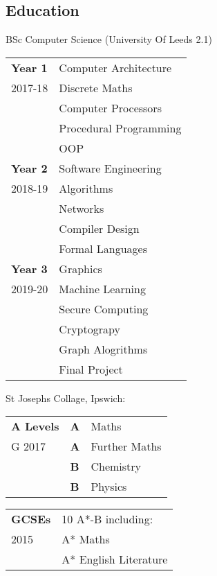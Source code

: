 \documentclass[9pt,a4paper]{article}
\begin{document}
\begin{multicols*}{3}
  \section*{Education}
  \vspace*{-.3cm}
  BSc Computer Science 
  \newline (University Of Leeds 2.1)
  \vspace*{-6mm}
\begin{center}
  \begin{tabular}{p{1.2cm}p{5.4cm}}
    \textbf{Year 1}&Computer Architecture\\
	2017-18&Discrete Maths\\
			&Computer Processors\\
	    &Procedural Programming\\
      &OOP\vspace{.3cm}\\
    \textbf{Year 2}&Software Engineering\\
    2018-19&Algorithms\\
    &Networks\\
    &Compiler Design\\
    &Formal Languages\vspace{.3cm}\\
    \textbf{Year 3}&Graphics\\
    2019-20&Machine Learning\\
    &Secure Computing\\
    &Cryptograpy\\
    &Graph Alogrithms\\
    &Final Project
  \end{tabular}
\end{center}
  St Josephs Collage, Ipswich:
  \vspace*{-.6cm}
\begin{center}
  \begin{tabular}{p{1.5cm} p{0.3cm} p{5.4cm}}
    \textbf{A Levels}&\textbf{A}&Maths\\
G	2017&\textbf{A}&Further Maths\\
	    &\textbf{B}&Chemistry\\
	    &\textbf{B}&Physics\\
  \end{tabular}
  \begin{tabular}{p{1.5cm} p{5.7cm}}
    \textbf{GCSEs}
        & 10 A*-B including:\\
        2015&A* Maths\\
        &A* English Literature
  \end{tabular}
\end{center}


\end{multicols*}
\end{document}
